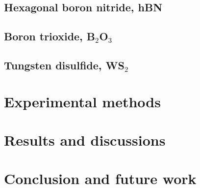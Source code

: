 \subsection{Hexagonal boron nitride, hBN}
\subsection{Boron trioxide, B$_2$O$_3$}
\subsection{Tungsten disulfide, WS$_2$}
\section{Experimental methods}
\section{Results and discussions}
\section{Conclusion and future work}